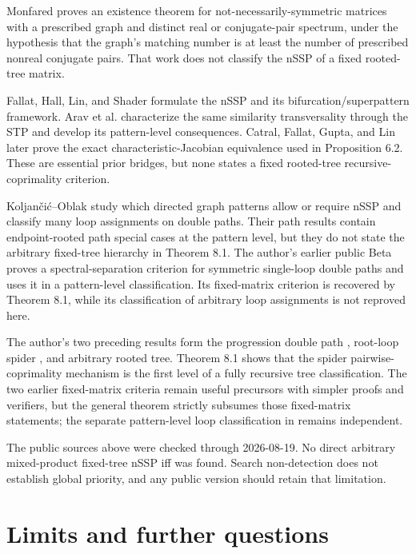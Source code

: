 \documentclass[11pt]{article}
\theoremstyle{remark}
\begin{document}
Monfared \cite{ref5} proves an existence theorem for not-necessarily-symmetric matrices with a prescribed graph and distinct real or conjugate-pair spectrum, under the hypothesis that the graph's matching number is at least the number of prescribed nonreal conjugate pairs. That work does not classify the nSSP of a fixed rooted-tree matrix.

Fallat, Hall, Lin, and Shader \cite{ref2} formulate the nSSP and its bifurcation/superpattern framework. Arav et al. \cite{ref11} characterize the same similarity transversality through the STP and develop its pattern-level consequences. Catral, Fallat, Gupta, and Lin \cite{ref1} later prove the exact characteristic-Jacobian equivalence used in Proposition 6.2. These are essential prior bridges, but none states a fixed rooted-tree recursive-coprimality criterion.

Koljan\v{c}i\'{c}--Oblak \cite{ref6} study which directed graph patterns allow or require nSSP and classify many loop assignments on double paths. Their path results contain endpoint-rooted path special cases at the pattern level, but they do not state the arbitrary fixed-tree hierarchy in Theorem 8.1. The author's earlier public Beta \cite{ref12} proves a spectral-separation criterion for symmetric single-loop double paths and uses it in a pattern-level classification. Its fixed-matrix criterion is recovered by Theorem 8.1, while its classification of arbitrary loop assignments is not reproved here.

The author's two preceding results form the progression double path \cite{ref12}, root-loop spider \cite{ref7}, and arbitrary rooted tree. Theorem 8.1 shows that the spider pairwise-coprimality mechanism is the first level of a fully recursive tree classification. The two earlier fixed-matrix criteria remain useful precursors with simpler proofs and verifiers, but the general theorem strictly subsumes those fixed-matrix statements; the separate pattern-level loop classification in \cite{ref12} remains independent.

The public sources above were checked through 2026-08-19. No direct arbitrary mixed-product fixed-tree nSSP iff was found. Search non-detection does not establish global priority, and any public version should retain that limitation.

\section{Limits and further questions}
\end{document}
